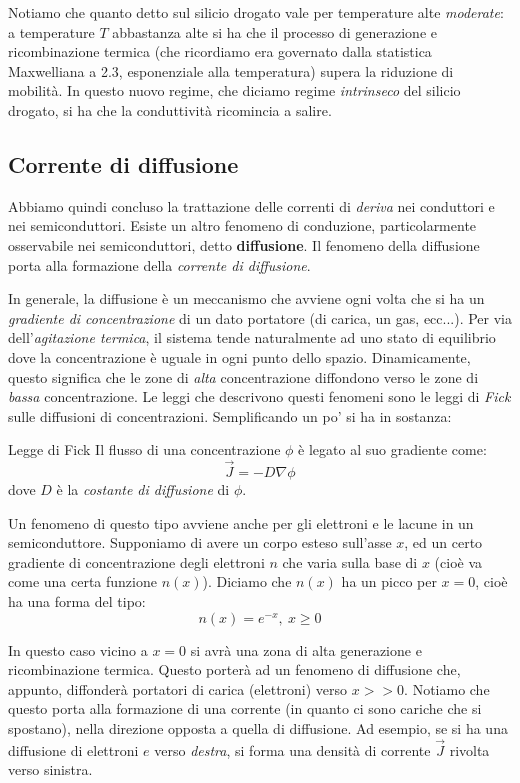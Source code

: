 \documentclass[a4paper,11pt]{article}
\begin{document}
Notiamo che quanto detto sul silicio drogato vale per temperature alte \textit{moderate}: a temperature $T$ abbastanza alte si ha che il processo di generazione e ricombinazione termica (che ricordiamo era governato dalla statistica Maxwelliana a 2.3, esponenziale alla temperatura) supera la riduzione di mobilità. In questo nuovo regime, che diciamo regime \textit{intrinseco} del silicio drogato, si ha che la conduttività ricomincia a salire. 

\subsection{Corrente di diffusione}
Abbiamo quindi concluso la trattazione delle correnti di \textit{deriva} nei conduttori e nei semiconduttori. Esiste un altro fenomeno di conduzione, particolarmente osservabile nei semiconduttori, detto \textbf{diffusione}. Il fenomeno della diffusione porta alla formazione della \textit{corrente di diffusione}.

In generale, la diffusione è un meccanismo che avviene ogni volta che si ha un \textit{gradiente di concentrazione} di un dato portatore (di carica, un gas, ecc...). Per via dell'\textit{agitazione termica}, il sistema tende naturalmente ad uno stato di equilibrio dove la concentrazione è uguale in ogni punto dello spazio. Dinamicamente, questo significa che le zone di \textit{alta} concentrazione diffondono verso le zone di \textit{bassa} concentrazione.
Le leggi che descrivono questi fenomeni sono le leggi di \textit{Fick} sulle diffusioni di concentrazioni. Semplificando un po' si ha in sostanza:
\begin{definition}{Legge di Fick}
	Il flusso di una concentrazione $\phi$ è legato al suo gradiente come:
	$$
	\vec{J} = -D \nabla \phi
	$$
	dove $D$ è la \textit{costante di diffusione} di $\phi$.
\end{definition}

Un fenomeno di questo tipo avviene anche per gli elettroni e le lacune in un semiconduttore. Supponiamo di avere un corpo esteso sull'asse $x$, ed un certo gradiente di concentrazione degli elettroni $n$ che varia sulla base di $x$ (cioè va come una certa funzione $n(x)$). Diciamo che $n(x)$ ha un picco per $x = 0$, cioè ha una forma del tipo:
$$
n(x) = e^{-x}, \ {x \geq 0}
$$

In questo caso vicino a $x = 0$ si avrà una zona di alta generazione e ricombinazione termica. Questo porterà ad un fenomeno di diffusione che, appunto, diffonderà portatori di carica (elettroni) verso $x >> 0$. Notiamo che questo porta alla formazione di una corrente (in quanto ci sono cariche che si spostano), nella direzione opposta a quella di diffusione.
Ad esempio, se si ha una diffusione di elettroni $e$ verso \textit{destra}, si forma una densità di corrente $\vec{J}$ rivolta verso sinistra.
\end{document}
